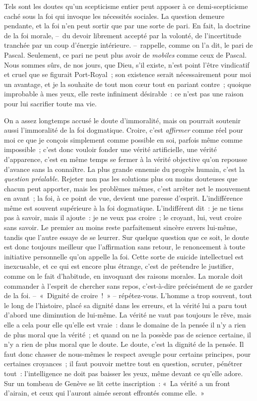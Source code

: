 \documentclass[french,twoside]{book} %
\begin{document}
Tels sont les doutes qu’un scepticisme entier peut apposer à ce demi-scepticisme caché sous la foi qui invoque les nécessités sociales. La question demeure pendante, et la foi n’en peut sortir que par une sorte de pari. En fait, la doctrine de la foi morale, – du devoir librement accepté par la volonté, de l’incertitude tranchée par un coup d’énergie intérieure. – rappelle, comme on l’a dit, le pari de Pascal. Seulement, ce pari ne peut plus avoir de \emph{mobiles} comme ceux de Pascal. Nous sommes sûrs, de nos jours, que Dieu, s’il existe, n’est point l’être vindicatif et cruel que se figurait Port-Royal ; son existence serait nécessairement pour moi un avantage, et je la souhaite de tout mon cœur tout en pariant contre ; quoique improbable à mes yeux, elle reste infiniment désirable : ce n’est pas une raison pour lui sacrifier toute ma vie.\par
On a assez longtemps accusé le doute d’immoralité, mais on pourrait soutenir aussi l’immoralité de la foi dogmatique. Croire, c’est \emph{affirmer} comme réel pour moi ce que je conçois simplement comme possible en soi, parfois même comme impossible ; c’est donc vouloir fonder une vérité artificielle, une vérité d’apparence, c’est en même temps se fermer à la vérité objective qu’on repousse d’avance sans la connaître. La plus grande ennemie du progrès humain, c’est la \emph{question préalable}. Rejeter non pas les solutions plus ou moins douteuses que chacun peut apporter, mais les problèmes mêmes, c’est arrêter net le mouvement en avant ; la foi, à ce point de vue, devient une paresse d’esprit. L’indifférence même est souvent supérieure à la foi dogmatique. L’indifférent dit : je ne tiens pas à savoir, mais il ajoute : je ne veux pas croire ; le croyant, lui, veut croire sans savoir. Le premier au moins reste parfaitement sincère envers lui-même, tandis que l’autre essaye de se leurrer. Sur quelque question que ce soit, le doute est donc toujours meilleur que l’affirmation sans retour, le renoncement à toute initiative personnelle qu’on appelle la foi. Cette sorte de suicide intellectuel est inexcusable, et ce qui est encore plus étrange, c’est de prétendre le justifier, comme on le fait d’habitude, en invoquant des raisons morales. La morale doit commander à l’esprit de chercher sans repos, c’est-à-dire précisément de se garder de la foi. – « Dignité de croire ! » – répétez-vous. L’homme a trop souvent, tout le long de l’histoire, placé sa dignité dans les erreurs, et la vérité lui a paru tout d’abord une diminution de lui-même. La vérité ne vaut pas toujours le rêve, mais elle a cela pour elle qu’elle est vraie : dans le domaine de la pensée il n’y a rien de plus moral que la vérité ; et quand on ne la possède pas de science certaine, il n’y a rien de plus moral que le doute. Le doute, c’est la dignité de la pensée. Il faut donc chasser de nous-mêmes le respect aveugle pour certains principes, pour certaines croyances ; il faut pouvoir mettre tout en question, scruter, pénétrer tout : l’intelligence ne doit pas baisser les yeux, même devant ce qu’elle adore. Sur un tombeau de Genève se lit cette inscription : « La vérité a un front d’airain, et ceux qui l’auront aimée seront effrontés comme elle. »\par
\end{document}
